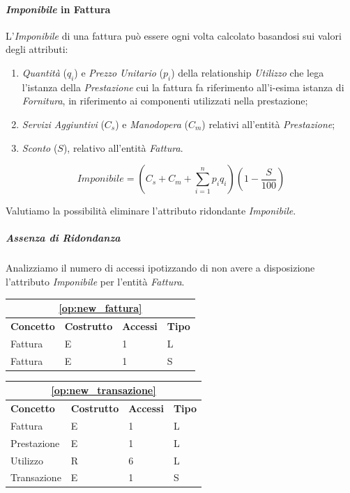 			\paragraph{\emph{Imponibile} in Fattura}

				L'\emph{Imponibile} di una fattura può essere ogni volta calcolato basandosi sui valori degli attributi:
				\begin{enumerate}
					\item \emph{Quantità} ($q_i$) e \emph{Prezzo Unitario} ($p_i$) della relationship \emph{Utilizzo} che lega l'istanza della \emph{Prestazione} cui la fattura fa riferimento all'i-esima istanza di \emph{Fornitura}, in riferimento ai componenti utilizzati nella prestazione;
					\item \emph{Servizi Aggiuntivi} ($C_s$) e \emph{Manodopera} ($C_m$) relativi all'entità \emph{Prestazione};
					\item \emph{Sconto} ($S$), relativo all'entità \emph{Fattura}.
				\end{enumerate}

				$$ Imponibile = \left( C_s + C_m + \sum_{i=1}^n p_i q_i \right)\left(1 - \frac{S}{100}\right) $$

				Valutiamo la possibilità eliminare l'attributo ridondante \emph{Imponibile}.

				\subparagraph{Assenza di Ridondanza}
					Analizziamo il numero di accessi ipotizzando di non avere a disposizione l'attributo \emph{Imponibile} per l'entità \emph{Fattura}.

					\vspace{2ex}
					\begin{tabular}{| p{3cm} | p{3cm} | p{3cm} | p{3cm} |}
						\hline
						\multicolumn{4}{|c|}{\textbf{\ref{op:new_fattura}}} \\ \hline
						\textbf{Concetto} & \textbf{Costrutto} & \textbf{Accessi} & \textbf{Tipo} \\ \hline
						Fattura & E & 1 & L \\
						Fattura & E & 1 & S \\
						\hline
					\end{tabular}

					\begin{tabular}{| p{3cm} | p{3cm} | p{3cm} | p{3cm} |}
						\hline
						\multicolumn{4}{|c|}{\textbf{\ref{op:new_transazione}}} \\ \hline
						\textbf{Concetto} & \textbf{Costrutto} & \textbf{Accessi} & \textbf{Tipo} \\ \hline
						Fattura 		& E & 1 & L \\
						Prestazione 	& E & 1 & L \\
						Utilizzo 		& R & 6 & L \\
						Transazione 	& E & 1 & S \\
						\hline
					\end{tabular}

